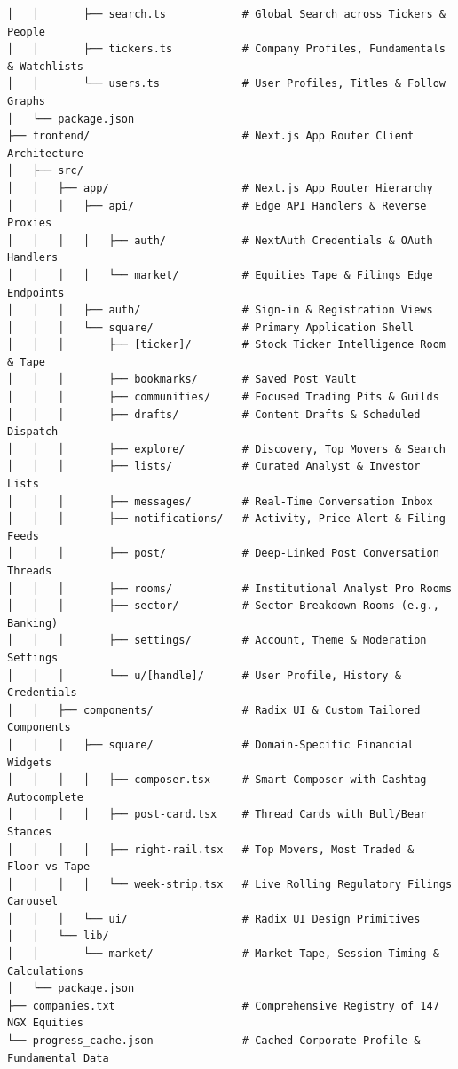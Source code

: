 \documentclass[11pt,a4paper]{article}
\begin{document}
\begin{verbatim}
│   │       ├── search.ts            # Global Search across Tickers & People
│   │       ├── tickers.ts           # Company Profiles, Fundamentals & Watchlists
│   │       └── users.ts             # User Profiles, Titles & Follow Graphs
│   └── package.json
├── frontend/                        # Next.js App Router Client Architecture
│   ├── src/
│   │   ├── app/                     # Next.js App Router Hierarchy
│   │   │   ├── api/                 # Edge API Handlers & Reverse Proxies
│   │   │   │   ├── auth/            # NextAuth Credentials & OAuth Handlers
│   │   │   │   └── market/          # Equities Tape & Filings Edge Endpoints
│   │   │   ├── auth/                # Sign-in & Registration Views
│   │   │   └── square/              # Primary Application Shell
│   │   │       ├── [ticker]/        # Stock Ticker Intelligence Room & Tape
│   │   │       ├── bookmarks/       # Saved Post Vault
│   │   │       ├── communities/     # Focused Trading Pits & Guilds
│   │   │       ├── drafts/          # Content Drafts & Scheduled Dispatch
│   │   │       ├── explore/         # Discovery, Top Movers & Search
│   │   │       ├── lists/           # Curated Analyst & Investor Lists
│   │   │       ├── messages/        # Real-Time Conversation Inbox
│   │   │       ├── notifications/   # Activity, Price Alert & Filing Feeds
│   │   │       ├── post/            # Deep-Linked Post Conversation Threads
│   │   │       ├── rooms/           # Institutional Analyst Pro Rooms
│   │   │       ├── sector/          # Sector Breakdown Rooms (e.g., Banking)
│   │   │       ├── settings/        # Account, Theme & Moderation Settings
│   │   │       └── u/[handle]/      # User Profile, History & Credentials
│   │   ├── components/              # Radix UI & Custom Tailored Components
│   │   │   ├── square/              # Domain-Specific Financial Widgets
│   │   │   │   ├── composer.tsx     # Smart Composer with Cashtag Autocomplete
│   │   │   │   ├── post-card.tsx    # Thread Cards with Bull/Bear Stances
│   │   │   │   ├── right-rail.tsx   # Top Movers, Most Traded & Floor-vs-Tape
│   │   │   │   └── week-strip.tsx   # Live Rolling Regulatory Filings Carousel
│   │   │   └── ui/                  # Radix UI Design Primitives
│   │   └── lib/
│   │       └── market/              # Market Tape, Session Timing & Calculations
│   └── package.json
├── companies.txt                    # Comprehensive Registry of 147 NGX Equities
└── progress_cache.json              # Cached Corporate Profile & Fundamental Data
\end{verbatim}
\end{document}
